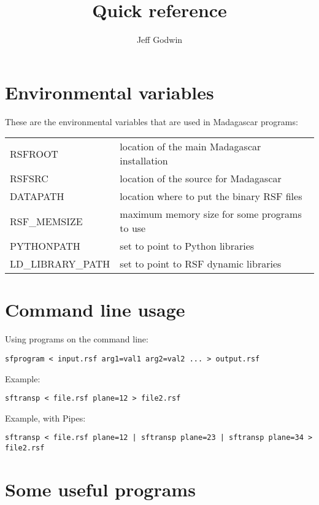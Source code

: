 \title{Quick reference}
\author{Jeff Godwin}
\maketitle

\section{Environmental variables}

These are the environmental variables that are used in Madagascar programs:

\begin{tabular}{| l | l |}
    \hline
    RSFROOT & location of the main Madagascar installation \\
    RSFSRC & location of the source for Madagascar \\
    DATAPATH & location where to put the binary RSF files \\
    RSF\_MEMSIZE & maximum memory size for some programs to use \\
    PYTHONPATH & set to point to Python libraries \\
    LD\_LIBRARY\_PATH & set to point to RSF dynamic libraries \\
    \hline
\end{tabular}

\section{Command line usage}

Using programs on the command line:
\begin{verbatim}
sfprogram < input.rsf arg1=val1 arg2=val2 ... > output.rsf
\end{verbatim}
Example:
\begin{verbatim}
sftransp < file.rsf plane=12 > file2.rsf
\end{verbatim}
Example, with Pipes:
\begin{verbatim}
sftransp < file.rsf plane=12 | sftransp plane=23 | sftransp plane=34 > file2.rsf
\end{verbatim}

\section{Some useful programs}

